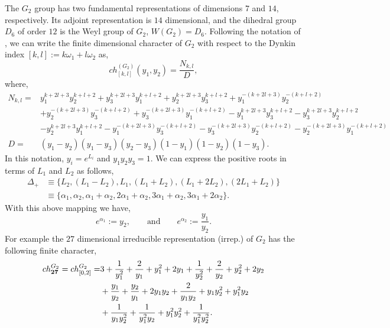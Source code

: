 \documentclass[a4paper,12pt]{article}
\begin{document}
The $G_2$ group has two fundamental representations of dimensions $7$ and $14$, respectively. Its adjoint representation is $14$ dimensional, and the dihedral group $D_6$ of order $12$ is the Weyl group of $G_2$, $W(G_2)=D_6$. Following the notation of \cite{crew2018branching}, we can write the finite dimensional character of $G_2$ with respect to the Dynkin index $[k,l]:=k\omega_1+l\omega_2$ as,
%
\begin{equation}\label{finite character of G2}
    ch_{[k,l]}^{(G_2)}(y_1,y_2)=\frac{N_{k,l}}{D},
\end{equation}
%
where,
%
\begin{align}
    N_{k,l} = & y_1^{k + 2 l + 3} y_2^{k + l + 2} + y_3^{k + 2 l + 3} y_1^{k + l + 2} + y_2^{k + 2 l + 3} y_3^{k + l + 2} + y_1^{-(k + 2 l + 3)} y_2^{-(k + l + 2)} \nonumber\\ 
   & + y_2^{-(k + 2 l + 3)} y_3^{-(k + l + 2)} + y_3^{-(k + 2 l + 3)} y_1^{-(k + l + 2)} - y_1^{k + 2 l + 3} y_3^{k + l + 2} - y_3^{k + 2 l + 3} y_2^{k + l + 2} \nonumber\\
   & - y_2^{k + 2 l + 3} y_1^{k + l + 2} - y_1^{-(k + 2 l + 3)} y_3^{-(k + l + 2)}-  y_3^{-(k + 2 l + 3)} y_2^{-(k + l + 2)} - y_2^{-(k + 2 l + 3) }y_1^{-(k + l + 2)}\nonumber\\
   D = & (y_1-y_2)(y_1-y_3)(y_2-y_3)(1-y_1)(1-y_2)(1-y_3).
\end{align}
%
In this notation, $y_i=e^{L_i}$ and $y_1y_2y_3=1$. We can express the positive roots in terms of $L_1$ and $L_2$ as follows,
%
\begin{align}\label{positive root of G2}
    {\Delta}_+ & \equiv \{L_2,(L_1-L_2),L_1,(L_1+L_2),(L_1+2L_2),(2L_1+L_2)\}\nonumber\\
    & \equiv \{\alpha_1,\alpha_2,\alpha_1+\alpha_2,2\alpha_1+\alpha_2,3\alpha_1+\alpha_2,3\alpha_1+2\alpha_2\}.
\end{align}
%
With this above mapping we have,
%
\begin{equation}\label{G2 roots at y1 y2}
    e^{\alpha_1}:=y_2, \qquad \text{and} \qquad e^{\alpha_2}:= \frac{y_1}{y_2}.
    \end{equation}
%
For example the $27$ dimensional irreducible representation (irrep.) of $G_2$ has the following finite character,
%
\begin{align}\label{27 G2}
    ch_{\bf{27}}^{G_2}=ch_{[0,2]}^{G_2}=& 3+\frac{1}{y_1^2}+\frac{2}{y_1}+y_1^2+2y_1+\frac{1}{y_2^2}+\frac{2}{y_2}+y_2^2+2y_2\nonumber\\
    &+\frac{y_1}{y_2}+\frac{y_2}{y_1}+2y_1y_2+\frac{2}{y_1y_2}+y_1y_2^2+y_1^2y_2\nonumber\\
    &+\frac{1}{y_1y_2^2}+\frac{1}{y_1^2y_2}+y_1^2y_2^2+\frac{1}{y_1^2y_2^2}.
\end{align}
\end{document}
